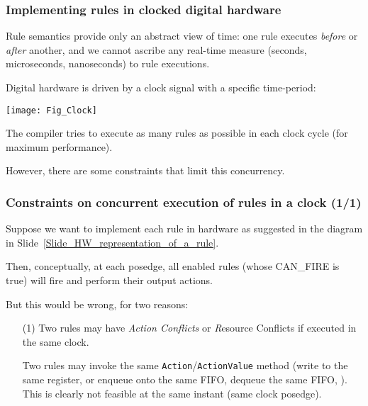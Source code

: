 \begin{frame}[fragile]
\frametitle{Implementing rules in clocked digital hardware}

\footnotesize

Rule semantics provide only an abstract view of time: one rule
executes \emph{before} or \emph{after} another, and we cannot ascribe
any real-time measure (seconds, microseconds, nanoseconds) to rule
executions.

\vspace{5ex}

Digital hardware is driven by a clock signal with a specific time-period:

\begin{center}
 \texttt{[image: Fig\_Clock]}
\end{center}

\vspace{2ex}

The {\bsc} compiler tries to execute as many rules as possible in each
clock cycle (for maximum performance).

\vspace{2ex}

However, there are some constraints that limit this concurrency.

\end{frame}


\begin{frame}[fragile]
\frametitle{Constraints on concurrent execution of rules in a clock (1/1)}

\footnotesize

Suppose we want to implement each rule in hardware as suggested in the
diagram in Slide~\ref{Slide_HW_representation_of_a_rule}.

\vspace{2ex}

Then, conceptually, at each posedge, all enabled rules (whose
CAN\_FIRE is true) will fire and perform their output actions.

\vspace{2ex}

But this would be wrong, for two reasons:

\begin{itemize}

 \item[(1)] Two rules may have \emph{Action Conflicts} or {\emph
       Resource Conflicts} if executed in the same clock.

       \vspace{2ex}

       Two rules may invoke the same {\tt Action}/{\tt ActionValue}
       method (write to the same register, or enqueue onto the same
       FIFO, dequeue the same FIFO, {\etc}).  This is clearly not
       feasible at the same instant (same clock posedge).

\end{itemize}

\end{frame}

